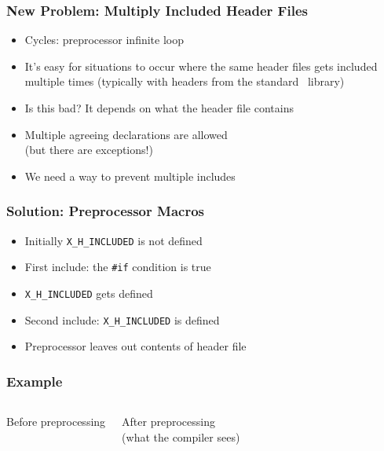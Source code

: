 \begin{frame}
  \frametitle{New Problem: Multiply Included Header Files}
  \begin{itemize}
    \item Cycles: preprocessor infinite loop
    \item It's easy for situations to occur where the same header
          files gets included multiple times (typically with headers from
          the standard \cpp\ library)
    \item Is this bad? It depends on what the header file contains
    \item Multiple agreeing declarations are allowed \\ (but there are exceptions!)
    \item We need a way to prevent multiple includes
  \end{itemize}
\end{frame}

\begin{frame}
  \frametitle{Solution: Preprocessor Macros}
  \begin{itemize}
    \item Initially {\tt X\_H\_INCLUDED} is not defined
    \item First include: the {\tt \#if} condition is true
    \item {\tt X\_H\_INCLUDED} gets defined
    \item Second include: {\tt X\_H\_INCLUDED} is defined
    \item Preprocessor leaves out contents of header file
  \end{itemize}
\end{frame}

\begin{frame}
  \frametitle{Example}
  \begin{columns}[t]
    \column{5cm}
    \begin{center} Before preprocessing \end{center}
    \column{5cm}
    \begin{center} After preprocessing \\ (what the compiler sees) \end{center}
    \vskip2cm
  \end{columns}
\end{frame}

